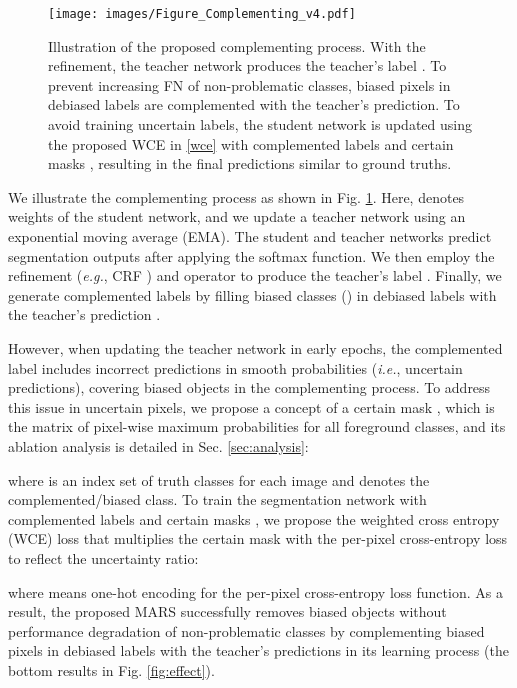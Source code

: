 \documentclass[10pt,twocolumn,letterpaper]{article}
\begin{document}
\begin{figure}[t]
  \centering
  \texttt{[image: images/Figure\_Complementing\_v4.pdf]}
\caption{
Illustration of the proposed complementing process. With the refinement, the teacher network produces the teacher's label . To prevent increasing FN of non-problematic classes, biased pixels in debiased labels  are complemented with the teacher's prediction. To avoid training uncertain labels, the student network is updated using the proposed WCE in \eqref{wce} with complemented labels  and certain masks , resulting in the final predictions similar to ground truths.
  }
  \label{fig:complementing}
\vspace{-0.4cm}
\end{figure}
We illustrate the complementing process as shown in Fig. \ref{fig:complementing}. Here,  denotes weights of the student network, and we update a teacher network  using an exponential moving average (EMA). The student and teacher networks predict segmentation outputs  after applying the softmax function. We then employ the refinement  (\emph{e.g.}, CRF \cite{krahenbuhl2011efficient}) and  operator to produce the teacher's label . Finally, we generate complemented labels  by filling biased classes () in debiased labels  with the teacher's prediction .

However, when updating the teacher network in early epochs, the complemented label  includes incorrect predictions in smooth probabilities (\emph{i.e.}, uncertain predictions), covering biased objects in the complementing process. To address this issue in uncertain pixels, we propose a concept of a certain mask , which is the matrix of pixel-wise maximum probabilities for all foreground classes, and its ablation analysis is detailed in Sec. \ref{sec:analysis}:
\begin{small}

\end{small}
where  is an index set of truth classes for each image  and  denotes the complemented/biased class. To train the segmentation network with complemented labels  and certain masks , we propose the weighted cross entropy (WCE) loss that multiplies the certain mask  with the per-pixel cross-entropy loss to reflect the uncertainty ratio:
\begin{small}

\end{small}
where  means one-hot encoding for the per-pixel cross-entropy loss function. As a result, the proposed MARS successfully removes biased objects without performance degradation of non-problematic classes by complementing biased pixels in debiased labels with the teacher's predictions in its learning process (the bottom results in Fig. \ref{fig:effect}).
\end{document}
